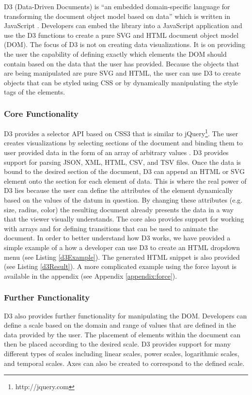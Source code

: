 D3 (Data-Driven Documents) is ``an embedded domain-specific language for transforming
the document object model based on data'' which is written in JavaScript \cite{2011-d3}. Developers can embed the library into a JavaScript application and use the D3 functions to create a pure SVG and HTML document object model (DOM). The focus of D3 is not on creating data visualizations. It is on providing the user the capability of defining exactly which elements the DOM should contain based on the data that the user has provided. Because the objects that are being manipulated are pure SVG and HTML, the user can use D3 to create objects that can be styled using CSS or by dynamically manipulating the style tags of the elements.

\subsubsection{Core Functionality}

D3 provides a selector API based on CSS3 that is similar to jQuery\footnote{http://jquery.com}. The user creates visualizations by selecting sections of the document and binding them to user provided data in the form of an array of arbitrary values \cite{2011-d3}. D3 provides support for parsing JSON, XML, HTML, CSV, and TSV files. Once the data is bound to the desired section of the document, D3 can append an HTML or SVG element onto the section for each element of data. This is where the real power of D3 lies because the user can define the attributes of the element dynamically based on the values of the datum in question. By changing these attributes (e.g. size, radius, color) the resulting document already presents the data in a way that the viewer visually understands. The core also provides support for working with arrays and for defining transitions that can be used to animate the document. In order to better understand how D3 works, we have provided a simple example of a how a developer can use D3 to create an HTML dropdown menu (see Listing \ref{d3Example}). The generated HTML snippet is also provided (see Listing \ref{d3Result}). A more complicated example using the force layout is available in the appendix (see Appendix \ref{appendix:force}).

\subsubsection{Further Functionality}

D3 also provides further functionality for manipulating the DOM. Developers can define a scale based on the domain and range of values that are defined in the data provided by the user. The placement of elements within the document can then be placed according to the desired scale. D3 provides support for many different types of scales including linear scales, power scales, logarithmic scales, and temporal scales. Axes can also be created to correspond to the defined scale.

